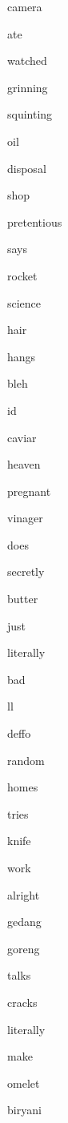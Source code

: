 \documentclass[varwidth]{standalone}
\begin{document}
\begin{CJK*}{UTF8}{gbsn}
{{{\colorbox{red!3.024527072906494}{\strut camera}
\colorbox{red!3.1261234283447266}{\strut ate}
\colorbox{red!1.7563362121582031}{\strut watched}
\colorbox{red!0}{\strut grinning}
\colorbox{red!7.282386779785156}{\strut squinting}
\colorbox{red!3.3271751403808594}{\strut oil}
\colorbox{red!0}{\strut disposal}
\colorbox{red!2.970378875732422}{\strut shop}
\colorbox{red!8.067434310913086}{\strut pretentious}
\colorbox{red!6.959542274475098}{\strut says}
\colorbox{red!1.7195231914520264}{\strut rocket}
\colorbox{red!2.553292989730835}{\strut science}
\colorbox{red!0.06670832633972168}{\strut hair}
\colorbox{red!1.0072274208068848}{\strut hangs}
\colorbox{red!7.236749649047852}{\strut bleh}
\colorbox{red!8.379768371582031}{\strut id}
\colorbox{red!6.93853759765625}{\strut caviar}
\colorbox{red!3.438753128051758}{\strut heaven}
\colorbox{red!0}{\strut pregnant}
\colorbox{red!0.91412353515625}{\strut vinager}
\colorbox{red!9.94167709350586}{\strut does}
\colorbox{red!7.399318695068359}{\strut secretly}
\colorbox{red!0.06955862045288086}{\strut butter}
\colorbox{red!7.7129740715026855}{\strut just}
\colorbox{red!12.357855796813965}{\strut literally}
\colorbox{red!4.637356758117676}{\strut bad}
\colorbox{red!4.542766571044922}{\strut ll}
\colorbox{red!6.147370338439941}{\strut deffo}
\colorbox{red!3.269685745239258}{\strut random}
\colorbox{red!0.2472538948059082}{\strut homes}
\colorbox{red!0.6440768241882324}{\strut tries}
\colorbox{red!2.0554046630859375}{\strut knife}
\colorbox{red!5.283692359924316}{\strut work}
\colorbox{red!2.1008224487304688}{\strut alright}
\colorbox{red!9.894512176513672}{\strut gedang}
\colorbox{red!11.63984489440918}{\strut goreng}
\colorbox{red!3.839649200439453}{\strut talks}
\colorbox{red!1.056387186050415}{\strut cracks}
\colorbox{red!12.832656860351562}{\strut literally}
\colorbox{red!10.365392684936523}{\strut make}
\colorbox{red!7.246112823486328}{\strut omelet}
\colorbox{red!7.401010990142822}{\strut biryani}

}}}
\end{CJK*}
\end{document}
